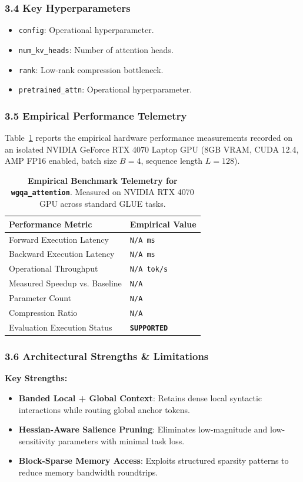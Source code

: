 \subsubsection*{3.4 Key Hyperparameters}
\begin{itemize}
    \item \texttt{config}: Operational hyperparameter.
    \item \texttt{num\_kv\_heads}: Number of attention heads.
    \item \texttt{rank}: Low-rank compression bottleneck.
    \item \texttt{pretrained\_attn}: Operational hyperparameter.
\end{itemize}

\subsubsection*{3.5 Empirical Performance Telemetry}
Table~\ref{tab:telemetry_wgqa_attention} reports the empirical hardware performance measurements recorded on an isolated NVIDIA GeForce RTX 4070 Laptop GPU (8GB VRAM, CUDA 12.4, AMP FP16 enabled, batch size $B=4$, sequence length $L=128$).

\begin{table}[h]
\centering
\small
\caption{\textbf{Empirical Benchmark Telemetry for \texttt{wgqa\_attention}}. Measured on NVIDIA RTX 4070 GPU across standard GLUE tasks.}
\label{tab:telemetry_wgqa_attention}
\begin{tabularx}{\columnwidth}{lX}
\toprule
\textbf{Performance Metric} & \textbf{Empirical Value} \\
\midrule
Forward Execution Latency & \texttt{N/A ms} \\
Backward Execution Latency & \texttt{N/A ms} \\
Operational Throughput & \texttt{N/A tok/s} \\
Measured Speedup vs. Baseline & \texttt{N/A} \\
Parameter Count & \texttt{N/A} \\
Compression Ratio & \texttt{N/A} \\
Evaluation Execution Status & \textbf{\texttt{SUPPORTED}} \\
\bottomrule
\end{tabularx}
\end{table}

\subsubsection*{3.6 Architectural Strengths \& Limitations}
\textbf{Key Strengths:}
\begin{itemize}
    \item \textbf{Banded Local + Global Context}: Retains dense local syntactic interactions while routing global anchor tokens.
    \item \textbf{Hessian-Aware Salience Pruning}: Eliminates low-magnitude and low-sensitivity parameters with minimal task loss.
    \item \textbf{Block-Sparse Memory Access}: Exploits structured sparsity patterns to reduce memory bandwidth roundtrips.
\end{itemize}

